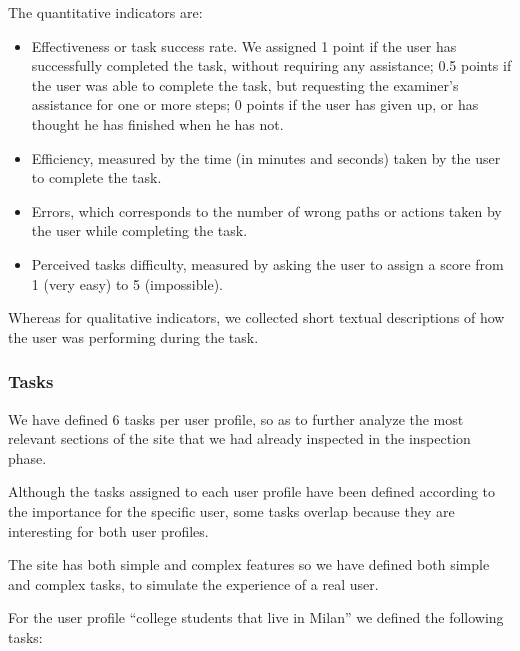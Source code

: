     The quantitative indicators are:
    \begin{itemize}
        \item Effectiveness or task success rate. We assigned 1 point if the user has successfully completed the task, without requiring any assistance; 0.5 points if the user was able to complete the task, but requesting the examiner's assistance for one or more steps; 0 points if the user has given up, or has thought he has finished when he has not.
        \item Efficiency, measured by the time (in minutes and seconds) taken by the user to complete the task.
        \item Errors, which corresponds to the number of wrong paths or actions taken by the user while completing the task.
        \item Perceived tasks difficulty, measured by asking the user to assign a score from 1 (very easy)  to 5 (impossible).
    \end{itemize}
    
    Whereas for qualitative indicators, we collected short textual descriptions of how the user was performing during the task.

    \subsubsection{Tasks}
    We have defined 6 tasks per user profile, so as to further analyze the most relevant sections of the site that we had already inspected in the inspection phase.

    Although the tasks assigned to each user profile have been defined according to the importance for the specific user, some tasks overlap because they are interesting for both user profiles.

    The site has both simple and complex features so we have defined both simple and complex tasks, to simulate the experience of a real user.
    
    For the user profile ``college students that live in Milan'' we defined the following tasks:

